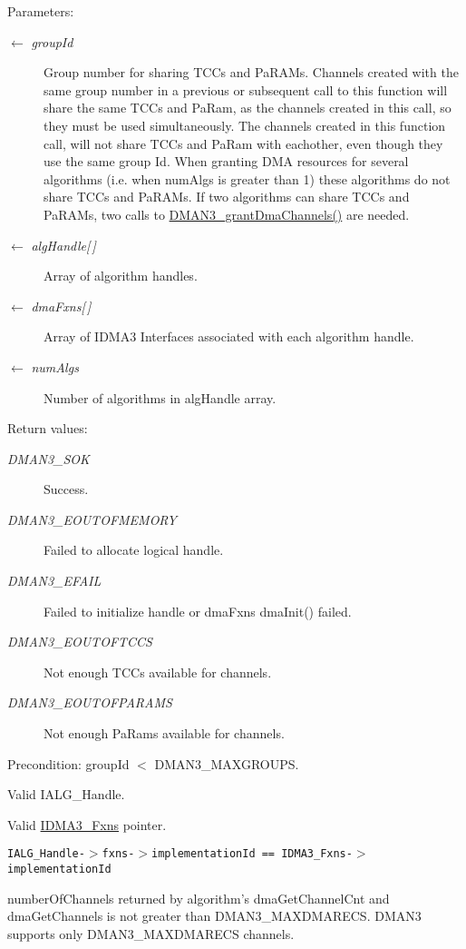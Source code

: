 \begin{Desc}
\item[Parameters:]
\begin{description}
\item[\mbox{$\leftarrow$} {\em group\-Id}]Group number for sharing TCCs and Pa\-RAMs. Channels created with the same group number in a previous or subsequent call to this function will share the same TCCs and Pa\-Ram, as the channels created in this call, so they must be used simultaneously. The channels created in this function call, will not share TCCs and Pa\-Ram with eachother, even though they use the same group Id. When granting DMA resources for several algorithms (i.e. when num\-Algs is greater than 1) these algorithms do not share TCCs and Pa\-RAMs. If two algorithms can share TCCs and Pa\-RAMs, two calls to \hyperlink{group___d_s_p_d_m_a_n3_ge0e5031bc5e947da1bd5d12cca1c5e00}{DMAN3\_\-grant\-Dma\-Channels()} are needed. \item[\mbox{$\leftarrow$} {\em alg\-Handle\mbox{[}$\,$\mbox{]}}]Array of algorithm handles. \item[\mbox{$\leftarrow$} {\em dma\-Fxns\mbox{[}$\,$\mbox{]}}]Array of IDMA3 Interfaces associated with each algorithm handle. \item[\mbox{$\leftarrow$} {\em num\-Algs}]Number of algorithms in alg\-Handle array.\end{description}
\end{Desc}
\begin{Desc}
\item[Return values:]
\begin{description}
\item[{\em DMAN3\_\-SOK}]Success. \item[{\em DMAN3\_\-EOUTOFMEMORY}]Failed to allocate logical handle. \item[{\em DMAN3\_\-EFAIL}]Failed to initialize handle or dma\-Fxns dma\-Init() failed. \item[{\em DMAN3\_\-EOUTOFTCCS}]Not enough TCCs available for channels. \item[{\em DMAN3\_\-EOUTOFPARAMS}]Not enough Pa\-Rams available for channels.\end{description}
\end{Desc}
\begin{Desc}
\item[Precondition:]group\-Id $<$ DMAN3\_\-MAXGROUPS. 

Valid IALG\_\-Handle. 

Valid \hyperlink{struct_i_d_m_a3___fxns}{IDMA3\_\-Fxns} pointer. 

{\tt IALG\_\-Handle-$>$fxns-$>$implementation\-Id == IDMA3\_\-Fxns-$>$implementation\-Id} 

number\-Of\-Channels returned by algorithm's dma\-Get\-Channel\-Cnt and dma\-Get\-Channels is not greater than DMAN3\_\-MAXDMARECS. DMAN3 supports only DMAN3\_\-MAXDMARECS channels.\end{Desc}
